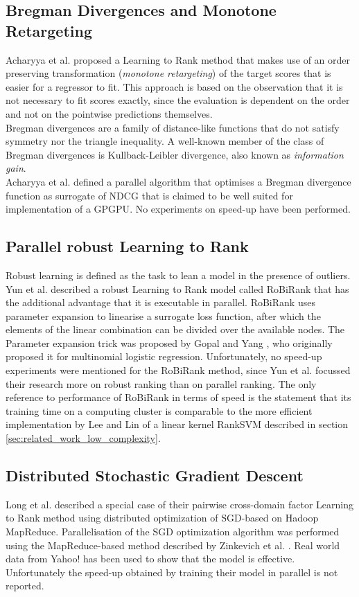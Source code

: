 \subsection{Bregman Divergences and Monotone Retargeting}
Acharyya et al. \cite{Acharyya2012, Acharyya2013} proposed a Learning to Rank method that makes use of an order preserving transformation (\emph{monotone retargeting}) of the target scores that is easier for a regressor to fit. This approach is based on the observation that it is not necessary to fit scores exactly, since the evaluation is dependent on the order and not on the pointwise predictions themselves.\\

Bregman divergences are a family of distance-like functions that do not satisfy symmetry nor the triangle inequality. A well-known member of the class of Bregman divergences is Kullback-Leibler divergence, also known as \emph{information gain}.\\

Acharyya et al. \cite{Acharyya2012, Acharyya2013} defined a parallel algorithm that optimises a Bregman divergence function as surrogate of \ac{NDCG} that is claimed to be well suited for implementation of a \ac{GPGPU}. No experiments on speed-up have been performed.
\subsection{Parallel robust Learning to Rank}
Robust learning \cite{Huber1981} is defined as the task to lean a model in the presence of outliers. Yun et al. described a \cite{Yun2014} robust Learning to Rank model called RoBiRank that has the additional advantage that it is executable in parallel. RoBiRank uses parameter expansion to linearise a surrogate loss function, after which the elements of the linear combination can be divided over the available nodes. The Parameter expansion trick was proposed by Gopal and Yang \cite{Gopal2013}, who originally proposed it for multinomial logistic regression. Unfortunately, no speed-up experiments were mentioned for the RoBiRank method, since Yun et al. focussed their research more on robust ranking than on parallel ranking. The only reference to performance of RoBiRank in terms of speed is the statement that its training time on a computing cluster is comparable to the more efficient implementation by Lee and Lin \cite{Lee2014} of a linear kernel Rank\ac{SVM} \cite{Herbrich1999, Joachims2002} described in section \ref{sec:related_work_low_complexity}.
\subsection{Distributed Stochastic Gradient Descent}
Long et al. \cite{Long2012} described a special case of their pairwise cross-domain factor Learning to Rank method using distributed optimization of \acs{SGD}-based on Hadoop MapReduce. Parallelisation of the \ac{SGD} optimization algorithm was performed using the MapReduce-based method described by  Zinkevich et al. \cite{Zinkevich2010}. Real world data from Yahoo! has been used to show that the model is effective. Unfortunately the speed-up obtained by training their model in parallel is not reported.\\

